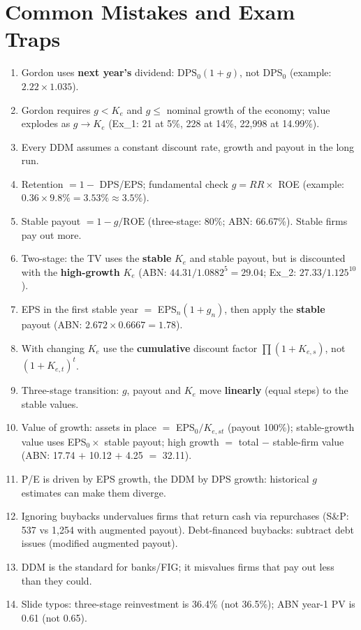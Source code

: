 \section{Common Mistakes and Exam Traps}
\begin{trapbox}
\begin{enumerate}[leftmargin=*]
  \item Gordon uses \textbf{next year's} dividend: $\text{DPS}_0(1+g)$, not DPS$_0$ (example: $2.22\times1.035$).
  \item Gordon requires $g<K_e$ and $g\leq$ nominal growth of the economy; value explodes as $g\to K_e$ (Ex\_1: 21 at 5\%, 228 at 14\%, 22,998 at 14.99\%).
  \item Every DDM assumes a constant discount rate, growth and payout in the long run.
  \item Retention $=1-$ DPS/EPS; fundamental check $g=RR\times$ ROE (example: $0.36\times9.8\%=3.53\%\approx3.5\%$).
  \item Stable payout $=1-g/\text{ROE}$ (three-stage: 80\%; ABN: 66.67\%). Stable firms pay out more.
  \item Two-stage: the TV uses the \textbf{stable} $K_e$ and stable payout, but is discounted with the \textbf{high-growth} $K_e$ (ABN: $44.31/1.0882^5=29.04$; Ex\_2: $27.33/1.125^{10}$).
  \item EPS in the first stable year $=$ EPS$_n(1+g_n)$, then apply the \textbf{stable} payout (ABN: $2.672\times0.6667=1.78$).
  \item With changing $K_e$ use the \textbf{cumulative} discount factor $\prod(1+K_{e,s})$, not $(1+K_{e,t})^t$.
  \item Three-stage transition: $g$, payout and $K_e$ move \textbf{linearly} (equal steps) to the stable values.
  \item Value of growth: assets in place $=$ EPS$_0/K_{e,st}$ (payout 100\%); stable-growth value uses EPS$_0\times$ stable payout; high growth $=$ total $-$ stable-firm value (ABN: 17.74 $+$ 10.12 $+$ 4.25 $=$ 32.11).
  \item P/E is driven by EPS growth, the DDM by DPS growth: historical $g$ estimates can make them diverge.
  \item Ignoring buybacks undervalues firms that return cash via repurchases (S\&P: 537 vs 1,254 with augmented payout). Debt-financed buybacks: subtract debt issues (modified augmented payout).
  \item DDM is the standard for banks/FIG; it misvalues firms that pay out less than they could.
  \item Slide typos: three-stage reinvestment is 36.4\% (not 36.5\%); ABN year-1 PV is 0.61 (not 0.65).
\end{enumerate}
\end{trapbox}
